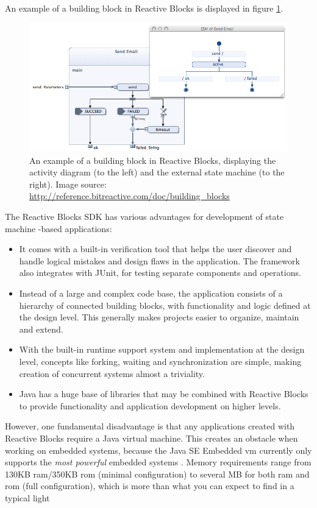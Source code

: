 An example of a building block in Reactive Blocks is displayed in figure \ref{figure:reactive_blocks}.

\begin{figure}[h]
	\centering
	\includegraphics[scale=0.5]{img/reactive_blocks.png}
	\caption[A building block in Reactive Blocks]{An example of a building block in Reactive Blocks, displaying the activity diagram (to the left) and the external state machine (to the right). Image source: \url{http://reference.bitreactive.com/doc/building_blocks} \label{figure:reactive_blocks} }
\end{figure}

The Reactive Blocks SDK has various advantages for development of state machine -based applications:
\begin{itemize}
	\item It comes with a built-in verification tool that helps the user discover and handle logical mistakes and design flaws in the application. The framework also integrates with JUnit, for testing separate components and operations.
	\item Instead of a large and complex code base, the application consists of a hierarchy of connected building blocks, with functionality and logic defined at the design level. This generally makes projects easier to organize, maintain and extend.
	\item With the built-in runtime support system and implementation at the design level, concepts like forking, waiting and synchronization are simple, making creation of concurrent systems almost a triviality.
	\item Java has a huge base of libraries that may be combined with Reactive Blocks to provide functionality and application development on higher levels.
\end{itemize}

However, one fundamental disadvantage is that any applications created with Reactive Blocks require a Java virtual machine. This creates an obstacle when working on embedded systems, because the Java SE Embedded \gls{vm} currently only supports the \textit{most powerful} embedded systems \cite{website:java_embedded_vm}. Memory requirements range from 130KB \gls{ram}/350KB \gls{rom} (minimal configuration) to several MB for both \gls{ram} and \gls{rom} (full configuration), which is more than what you can expect to find in a typical light


